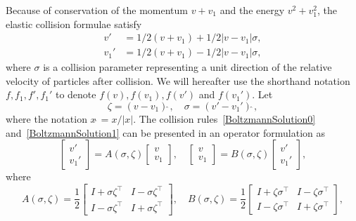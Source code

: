 \documentclass[12pt,nopreprintline]{elsarticle}
\begin{document}
Because of conservation of the momentum $v+v_1$ and the energy $v^2 + v_1^2$, the elastic collision formulae satisfy
\begin{align}
v' &= 1/2 (v+v_1) + 1/2 |v-v_1| \sigma ,  \label{BoltzmannSolution0} \\
v_1'&=1/2 (v+v_1) - 1/2  |v-v_1| \sigma ,
\label{BoltzmannSolution1}
\end{align}
where $\sigma$ is a collision parameter representing a unit direction of the relative velocity of particles after collision. We will hereafter use the shorthand notation $f, f_1, f', f_1'$ to denote $f(v), f(v_1), f(v')$ and $f(v_1')$. Let
\begin{equation}\label{eq:alpha-sigma}
\zeta = (v -v_1){\hat~}, \quad \sigma = (v' -v_1'){\hat~},
\end{equation}
where the notation $x{\hat~} = x/|x|.$ The collision rules~\eqref{BoltzmannSolution0} and~\eqref{BoltzmannSolution1} can be presented in an operator formulation as
\begin{equation}\label{eq:AB_vel_General}
        \begin{bmatrix}
    v'\\
   v_1'
    \end{bmatrix}    = A(\sigma,\zeta) \begin{bmatrix}
    v\\
    v_1
    \end{bmatrix}, \quad
   \begin{bmatrix}
    v\\
     v_1
    \end{bmatrix}     = B(\sigma,\zeta)    \begin{bmatrix}
    v'\\
    v_1'
    \end{bmatrix},
\end{equation}
where
\begin{equation} \label{eq:AB_def}
A(\sigma ,\zeta )= \frac{1}{2}\begin{bmatrix}
    I+\sigma  \zeta ^\top & I-\sigma  \zeta ^\top\\
    I-\sigma  \zeta ^\top & I+\sigma  \zeta ^\top
    \end{bmatrix},\quad B(\sigma ,\zeta )= \frac{1}{2}\begin{bmatrix}
    I+\zeta  \sigma ^\top & I-\zeta  \sigma ^\top\\
    I-\zeta  \sigma ^\top & I+\zeta  \sigma ^\top
    \end{bmatrix},
\end{equation}
\end{document}
